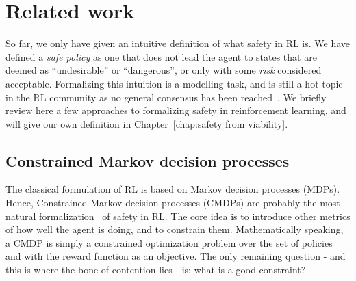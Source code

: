 	
\section{Related work}
	So far, we only have given an intuitive definition of what safety in RL is. We have defined a\emph{ safe policy} as one that does not lead the agent to states that are deemed as \enquote{undesirable} or \enquote{dangerous}, or only with some\emph{ risk} considered acceptable. Formalizing this intuition is a modelling task, and is still a hot topic in the RL community as no general consensus has been reached~\cite{garcia2015comprehensive}. We briefly review here a few approaches to formalizing safety in reinforcement learning, and will give our own definition in Chapter~\ref{chap:safety from viability}.
	
	\subsection{Constrained Markov decision processes} \label{subsec:CMDPs related work}
		The classical formulation of RL is based on Markov decision processes (MDPs). Hence, Constrained Markov decision processes (CMDPs) are probably the most natural formalization~\cite{garcia2015comprehensive} of safety in RL. The core idea is to introduce other metrics of how well the agent is doing, and to constrain them. Mathematically speaking, a CMDP is simply a constrained optimization problem over the set of policies and with the reward function as an objective. The only remaining question - and this is where the bone of contention lies - is: what is a good constraint? 
		
